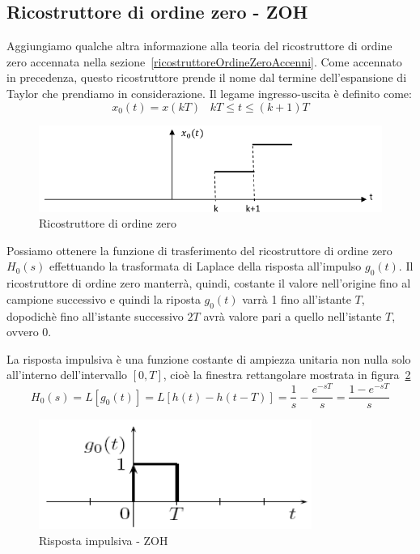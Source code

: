 \documentclass[a4paper]{report}
\begin{document}
\subsection{Ricostruttore di ordine zero - ZOH}
Aggiungiamo qualche altra informazione alla teoria del ricostruttore
di ordine zero accennata nella
sezione~\ref{ricostruttoreOrdineZeroAccenni}. Come accennato in
precedenza, questo ricostruttore prende il nome dal termine
dell'espansione di Taylor che prendiamo in considerazione. Il legame
ingresso-uscita \`e definito come:
\begin{equation}\label{eq:ricostruttoreOrdineZero00} 
  x_0(t) = x(kT) \;\;\; kT \leq t \leq (k + 1)T
\end{equation}
\begin{figure}[!h]
  \begin{center}
    \includegraphics[scale=0.5]{./figures/ricostruttoreOrdineZero00.png}
    \caption{Ricostruttore di ordine
      zero}\label{fig:ricostruttoreOrdineZero00} 
  \end{center}
\end{figure}

Possiamo ottenere la funzione di trasferimento del ricostruttore di
ordine zero $H_0(s)$ effettuando la trasformata di Laplace della
risposta all'impulso $g_0(t)$. Il ricostruttore di ordine zero manterr\`a,
quindi, costante il valore nell'origine fino al campione successivo e
quindi la riposta $g_0(t)$ varr\`a 1 fino all'istante $T$, dopodich\`e
fino all'istante successivo $2T$ avr\`a valore pari a quello
nell'istante $T$, ovvero 0.

La risposta impulsiva \`e una funzione costante di ampiezza unitaria
non nulla solo all'interno dell'intervallo $[0, T]$, cio\`e la
finestra rettangolare mostrata in
figura~\ref{fig:ricostruttoreOrdineZeroRispostaImpulsiva}
\begin{equation}\label{eq:ricostruttoreOrdineZero}
  H_0(s) = L[g_0(t)] = L[h(t) - h(t - T)] = \dfrac{1}{s} - \dfrac{e^{-sT}}{s} =
  \dfrac{1 - e^{-sT}}{s}
\end{equation}

\begin{figure}[!h]
  \begin{center}
    \includegraphics[scale=0.5]{./figures/ricostruttoreOrdineZeroRispostaImpulsiva.png}
    \caption{Risposta impulsiva -
      ZOH}\label{fig:ricostruttoreOrdineZeroRispostaImpulsiva}
  \end{center}
\end{figure}
\end{document}
